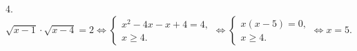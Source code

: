 4. $\sqrt{x-1}\cdot\sqrt{x-4}=2\Leftrightarrow \begin{cases} x^2-4x-x+4=4,\\ x\geqslant4.\end{cases}
\Leftrightarrow \begin{cases} x(x-5)=0,\\ x\geqslant4.\end{cases}\Leftrightarrow x=5.$\\
